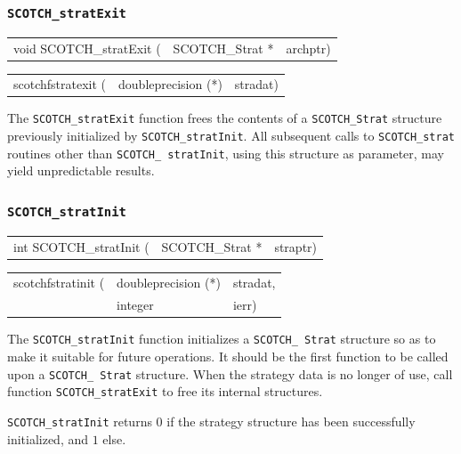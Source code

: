 \subsubsection{{\tt SCOTCH\_stratExit}}

\begin{itemize}
\progsyn

{\tt\begin{tabular}{l@{}ll}
void SCOTCH\_stratExit ( & SCOTCH\_Strat * & archptr)
\end{tabular}}

{\tt\begin{tabular}{l@{}ll}
scotchfstratexit ( & doubleprecision (*) & stradat)
\end{tabular}}

\progdes

The {\tt SCOTCH\_stratExit} function frees the contents of a
{\tt SCOTCH\_\lbt Strat} structure previously initialized by
{\tt SCOTCH\_\lbt strat\lbt Init}. All subsequent calls to
{\tt SCOTCH\_\lbt strat} routines other than {\tt SCOTCH\_\lbt
strat\lbt Init}, using this structure as parameter, may yield
unpredictable results.
\end{itemize}

\subsubsection{{\tt SCOTCH\_stratInit}}

\begin{itemize}
\progsyn

{\tt\begin{tabular}{l@{}ll}
int SCOTCH\_stratInit ( & SCOTCH\_Strat * & straptr)
\end{tabular}}

{\tt\begin{tabular}{l@{}ll}
scotchfstratinit ( & doubleprecision (*) & stradat, \\
                   & integer             & ierr)
\end{tabular}}

\progdes

The {\tt SCOTCH\_stratInit} function initializes a {\tt SCOTCH\_\lbt
Strat} structure so as to make it suitable for future operations. It
should be the first function to be called upon a {\tt SCOTCH\_\lbt
Strat} structure. When the strategy data is no longer of use, call
function {\tt SCOTCH\_\lbt strat\lbt Exit} to free its internal
structures.

\progret

{\tt SCOTCH\_stratInit} returns $0$ if the strategy structure has been
successfully initialized, and $1$ else.
\end{itemize}

